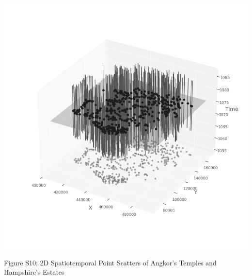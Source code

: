 \documentclass[
  11pt,
  letterpaper,
  DIV=11,
  numbers=noendperiod]{scrartcl}
\begin{document}
\includegraphics{analysis_files/figure-pdf/cell-22-output-1.png}

Figure S10: 2D Spatiotemporal Point Scatters of Angkor's Temples and
Hampshire's Estates
\end{document}
